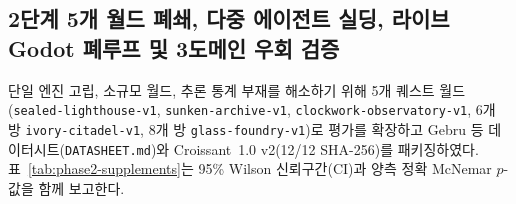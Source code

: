 \subsection{2단계 5개 월드 폐쇄, 다중 에이전트 실딩, 라이브 Godot 폐루프 및 3도메인 우회 검증}\label{sec:phase2-supplements}
단일 엔진 고립, 소규모 월드, 추론 통계 부재를 해소하기 위해 5개 퀘스트 월드(\texttt{sealed-\allowbreak lighthouse-\allowbreak v1}, \texttt{sunken-\allowbreak archive-\allowbreak v1}, \texttt{clockwork-\allowbreak observatory-\allowbreak v1}, 6개 방 \texttt{ivory-\allowbreak citadel-\allowbreak v1}, 8개 방 \texttt{glass-\allowbreak foundry-\allowbreak v1})로 평가를 확장하고 Gebru 등 데이터시트(\texttt{DATASHEET.md})와 Croissant~1.0 v2(12/12 SHA-256)를 패키징하였다. 표~\ref{tab:phase2-supplements}는 95\% Wilson 신뢰구간(CI)과 양측 정확 McNemar $p$-값을 함께 보고한다.

